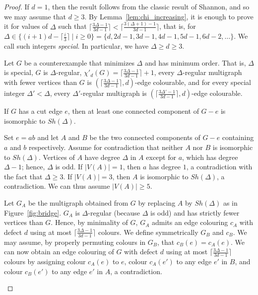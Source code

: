 \begin{proof}
If $d = 1$, then the result follows from the classic result of Shannon, and so we may assume that $d \geq 3$. 
By Lemma~\ref{lem:chi_increasing}, it is enough to prove it for values of $\Delta$ such that $\lceil \frac{3\Delta - 1}{3d - 1} \rceil < \lceil \frac{3(\Delta +1) - 1}{3d - 1} \rceil$, that is, for $\Delta \in \{(i+1)d - \lceil \frac{i}{3} \rceil \mid i \geq 0\} = \{d, 2d-1, 3d-1, 4d-1, 5d-1, 6d-2, \dots\}$. We call such integers \textit{special}. In particular, we have $\Delta \geq d \geq 3$. 


Let $G$ be a counterexample that minimizes  $\Delta$ and has minimum order. That is, $\Delta$ is special, $G$ is $\Delta$-regular, $\chi'_d(G) = \lceil \frac{3\Delta - 1}{3d - 1} \rceil +1$, every $\Delta$-regular multigraph with fewer vertices than $G$ is $(\lceil \frac{3\Delta - 1}{3d - 1} \rceil, d)$-edge colourable, and for every special integer $\Delta' < \Delta$, every $\Delta'$-regular multigraph is $( \lceil \frac{3\Delta' - 1}{3d - 1} \rceil, d)$-edge colourable. 
\medskip 




\begin{claim}\label{lem:extremity_shannon}
If $G$ has a cut edge $e$, then at least one connected component of $G - e$ is isomorphic to $Sh(\Delta)$. 
\end{claim}

\begin{proofclaim}
Set $e = ab$ and let $A$ and $B$ be the two connected components of $G - e$ containing $a$ and $b$ respectively. 
Assume for contradiction that neither $A$ nor $B$ is isomorphic to $Sh(\Delta)$. 
Vertices of $A$ have degree $\Delta$ in $A$ except for $a$, which has degree $\Delta -1$; hence, $\Delta$ is odd.  
If $|V(A)| = 1$, then $a$ has degree $1$, a contradiction with the fact that $\Delta \geq 3$.  
If $|V(A)| = 3$, then $A$ is isomorphic to $Sh(\Delta)$, a contradiction. 
We can thus assume $|V(A)| \geq 5$.    

Let $G_A$ be the multigraph obtained from $G$ by replacing $A$ by $Sh(\Delta)$ as in  Figure~\ref{fig:bridge}. $G_A$ is $\Delta$-regular (because $\Delta$ is odd) and has strictly fewer vertices than $G$. 
Hence, by minimality of $G$, $G_A$ admits an edge colouring $c_A$ with defect $d$ using at most  $\lceil \frac{3\Delta - 1}{3d - 1} \rceil$ colours. %
We define symmetrically $G_B$ and $c_B$. We may assume, by properly permuting colours in $G_B$, that $c_B(e) = c_A(e)$. 
 We can now obtain an edge colouring of $G$ with defect $d$ using at most $\lceil \frac{3\Delta - 1}{3d - 1} \rceil$ colours by assigning colour $c_A(e)$ to $e$, colour $c_{A}(e')$ to any edge $e'$ in $B$, and colour $c_{B}(e')$ to any edge $e'$ in $A$, a contradiction.  
\end{proofclaim}


\end{proof}

